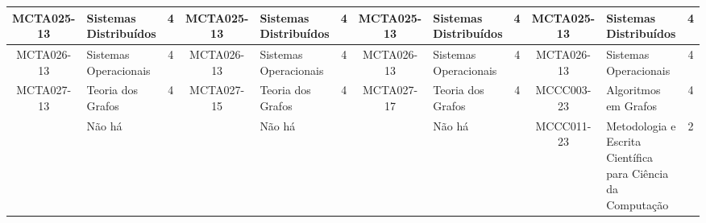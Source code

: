 \documentclass[a4paper]{article}
\begin{document}
\begin{landscape}
{\begin{longtable}{|c|p{.2\textheight}|c||c|p{.2\textheight}|c||c|p{.2\textheight}|c||c|p{.2\textheight}|c|}
    MCTA025-13 & Sistemas Distribuídos & 4 &
    MCTA025-13 & Sistemas Distribuídos & 4 & 
    MCTA025-13 & Sistemas Distribuídos & 4 & 
    MCTA025-13 & Sistemas Distribuídos & 4 \\ \hline

    MCTA026-13 & Sistemas Operacionais & 4 & 
    MCTA026-13 & Sistemas Operacionais & 4 & 
    MCTA026-13 & Sistemas Operacionais & 4 & 
    MCTA026-13 & Sistemas Operacionais & 4 \\ \hline

    MCTA027-13 & Teoria dos Grafos & 4 &
    MCTA027-15 & Teoria dos Grafos & 4 &
    MCTA027-17 & Teoria dos Grafos & 4 &
    MCCC003-23 & Algoritmos em Grafos & 4 \\ \hline

    & Não há & &
    & Não há & & 
    & Não há & & 
    MCCC011-23 & Metodologia e Escrita Científica para Ciência da Computação & 2 \\ \hline

\end{longtable}
}
\end{landscape}
\end{document}

